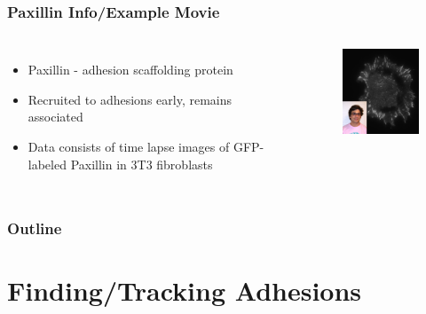 \documentclass{beamer}
\begin{document}
\begin{frame}
	\frametitle{Paxillin Info/Example Movie}
	\begin{columns}
		\begin{itemize}
		\item Paxillin - adhesion scaffolding protein
		\item Recruited to adhesions early, remains associated
		\item Data consists of time lapse images of GFP-labeled Paxillin in 3T3 fibroblasts
		\end{itemize}
		\begin{center}
		\begin{figure}[htbp]
		\includegraphics[width=5cm]{figures/intro/sample_original_data_w_eric}
		\end{figure}
		\end{center}
	\end{columns}
\end{frame}

\begin{frame}
  \frametitle{Outline}
  \tableofcontents
\end{frame}

\section[Finding/Tracking]{Finding/Tracking Adhesions}
\end{document}
